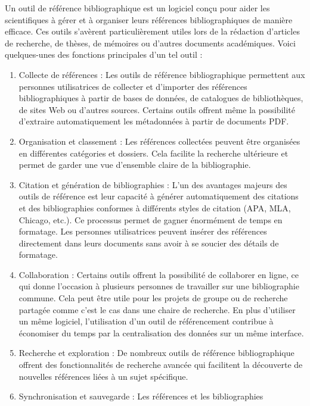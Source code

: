 \documentclass[
  letterpaper,
]{scrbook}
\begin{document}
Un outil de référence bibliographique est un logiciel conçu pour aider
les scientifiques à gérer et à organiser leurs références
bibliographiques de manière efficace. Ces outils s'avèrent
particulièrement utiles lors de la rédaction d'articles de recherche, de
thèses, de mémoires ou d'autres documents académiques. Voici
quelques-unes des fonctions principales d'un tel outil :

\begin{enumerate}
\def\labelenumi{\arabic{enumi}.}
\item
  Collecte de références : Les outils de référence bibliographique
  permettent aux personnes utilisatrices de collecter et d'importer des
  références bibliographiques à partir de bases de données, de
  catalogues de bibliothèques, de sites Web ou d'autres sources.
  Certains outils offrent même la possibilité d'extraire automatiquement
  les métadonnées à partir de documents PDF.
\item
  Organisation et classement : Les références collectées peuvent être
  organisées en différentes catégories et dossiers. Cela facilite la
  recherche ultérieure et permet de garder une vue d'ensemble claire de
  la bibliographie.
\item
  Citation et génération de bibliographies : L'un des avantages majeurs
  des outils de référence est leur capacité à générer automatiquement
  des citations et des bibliographies conformes à différents styles de
  citation (APA, MLA, Chicago, etc.). Ce processus permet de gagner
  énormément de temps en formatage. Les personnes utilisatrices peuvent
  insérer des références directement dans leurs documents sans avoir à
  se soucier des détails de formatage.
\item
  Collaboration : Certains outils offrent la possibilité de collaborer
  en ligne, ce qui donne l'occasion à plusieurs personnes de travailler
  sur une bibliographie commune. Cela peut être utile pour les projets
  de groupe ou de recherche partagée comme c'est le cas dans une chaire
  de recherche. En plus d'utiliser un même logiciel, l'utilisation d'un
  outil de référencement contribue à économiser du temps par la
  centralisation des données sur un même interface.
\item
  Recherche et exploration : De nombreux outils de référence
  bibliographique offrent des fonctionnalités de recherche avancée qui
  facilitent la découverte de nouvelles références liées à un sujet
  spécifique.
\item
  Synchronisation et sauvegarde : Les références et les bibliographies

\end{enumerate}
\end{document}
